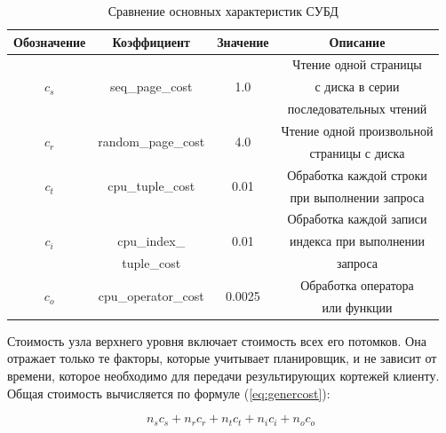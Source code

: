 \begin{table}[ht!]
	\centering
	\captionsetup{singlelinecheck = false, justification=raggedright}
	\caption{Сравнение основных характеристик СУБД}
	\label{table:cost_plan}
	\begin{tabular}{|c|c|c|c|}
		\hline 
		Обозначение & Коэффициент & Значение & Описание\\ \hline
		\multirow{3}{*}{$c_{s}$}	   & \multirow{3}{*}{seq\_page\_cost} & \multirow{3}{*}{1.0} & Чтение одной страницы \\ 
		& &  & с диска в серии \\
		& & & последовательных чтений \\ \hline
		\multirow{2}{*}{$c_{r}$} & \multirow{2}{*}{random\_page\_cost} & \multirow{2}{*}{4.0} & Чтение одной произвольной \\
		& & & страницы с диска \\ \hline
		\multirow{2}{*}{$c_{t}$}	   & \multirow{2}{*}{cpu\_tuple\_cost} & \multirow{2}{*}{0.01} & Обработка каждой строки \\ 
		& &  & при выполнении запроса \\ \hline
		\multirow{3}{*}{$c_{i}$}	   &  & \multirow{3}{*}{0.01} & Обработка каждой записи \\ 
		&  cpu\_index\_ &  & индекса при выполнении \\ 
		& tuple\_cost&  & запроса \\ \hline
		\multirow{2}{*}{$c_{o}$}	   & \multirow{2}{*}{cpu\_operator\_cost} & \multirow{2}{*}{0.0025} & Обработка оператора \\ 
		& &  & или функции \\ \hline
	\end{tabular}
\end{table}
Стоимость узла верхнего уровня включает стоимость всех его потомков. Она отражает только те факторы, которые учитывает планировщик, и не зависит от времени, которое необходимо для передачи результирующих кортежей клиенту. Общая стоимость вычисляется по формуле (\ref{eq:genercost}):

\vspace{-0.5cm}
\begin{equation}
	\label{eq:genercost}
	n_{s}c_{s} + n_{r}c_{r} + n_{t}c_{t} + n_{i}c_{i} + n_{o}c_{o}	
\end{equation}


